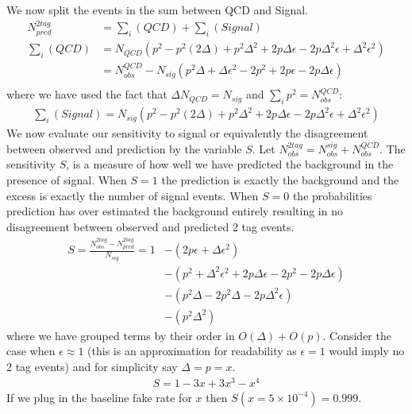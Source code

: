 We now split the events in the sum between QCD and Signal. 
\begin{align*}
N_{pred}^{2tag} &= \sum_i (QCD) + \sum_i (Signal)\\
\sum_i (QCD) &= N_{QCD} ( p^2 - p^2(2\Delta) + p^2\Delta^2 + 2p\Delta \epsilon - 2 p \Delta^2 \epsilon + \Delta^2 \epsilon^2)\\
&= N_{obs}^{QCD} - N_{sig}(p^2\Delta + \Delta \epsilon^2 - 2p^2 + 2p\epsilon - 2p\Delta \epsilon) \\
\end{align*}
where we have used the fact that $\Delta N_{QCD} = N_{sig}$ and $\sum_i p^2 = N_{obs}^{QCD}$:
\begin{align*}
\sum_i(Signal) =  N_{sig}(  p^2 - p^2(2\Delta) + p^2\Delta^2 + 2p\Delta \epsilon - 2 p \Delta^2 \epsilon + \Delta^2 \epsilon^2)
\end{align*}
We now evaluate our sensitivity to signal or equivalently the disagreement between observed and prediction by the variable $S$. Let 
$N_{obs}^{2tag} = N_{obs}^{sig} + N_{obs}^{QCD}$. The sensitivity $S$, is a measure of how well we have predicted the background
in the presence of signal. When $S=1$ the prediction is exactly the background and the excess is exactly the number of signal events. 
When $S=0$ the probabilities prediction has over estimated the background entirely resulting in no disagreement between observed and predicted 
2 tag events.
\begin{align*}
S = \frac{N_{obs}^{2tag} - N_{pred}^{2tag} }{N_{sig}} = 1 &- (2p\epsilon + \Delta \epsilon^2) \\
&- (p^2 + \Delta^2\epsilon^2 +  2p\Delta\epsilon -2p^2  - 2p\Delta\epsilon) \\
&- (p^2\Delta -2p^2\Delta -2p\Delta^2\epsilon) \\
&- (p^2\Delta^2)
\end{align*}
where we have grouped terms by their order in $O(\Delta)+O(p)$. Consider the case when
$\epsilon \approx 1$ (this is an approximation for readability as $\epsilon=1$ would imply no 2 tag events) and for simplicity say $\Delta = p = x$.
\begin{align*}
S= 1 - 3x + 3 x^3 - x^4
\end{align*}
If we plug in the baseline fake rate for $x$  then $S(x=5\times10^{-4})= 0.999$. 

